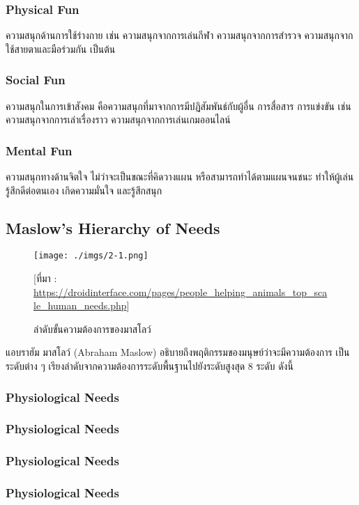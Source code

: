 \documentclass[12pt,oneside,openright,a4paper]{cpe-thai-project}
\begin{document}
\subsubsection{Physical Fun}
ความสนุกด้านการใช้ร่างกาย เช่น ความสนุกจากการเล่นกีฬา 
ความสนุกจากการสำรวจ ความสนุกจากใช้สายตาและมือร่วมกัน เป็นต้น
\subsubsection{Social Fun}
ความสนุกในการเข้าสังคม คือความสนุกที่มาจากการมีปฏิสัมพันธ์กับผู้อื่น 
การสื่อสาร การแข่งขัน เช่น ความสนุกจากการเล่าเรื่องราว 
ความสนุกจากการเล่นเกมออนไลน์
\subsubsection{Mental Fun}
ความสนุกทางด้านจิตใจ ไม่ว่าจะเป็นขณะที่คิดวางแผน 
หรือสามารถทำได้ตามแผนจนชนะ ทำให้ผู้เล่นรู้สึกดีต่อตนเอง 
เกิดความมั่นใจ และรู้สึกสนุก

\subsection{Maslow’s Hierarchy of Needs}

\begin{figure}[!h]\centering
\texttt{[image: ./imgs/2-1.png]}
\caption{ลำดับขั้นความต้องการของมาสโลว์}\label{fig:2-1}
\small [ที่มา : \url{https://droidinterface.com/pages/people_helping_animals_top_scale_human_needs.php}]
\end{figure}

แอบราฮัม มาสโลว์ (Abraham Maslow) อธิบายถึงพฤติกรรมของมนุษย์ว่าจะมีความต้องการ
เป็นระดับต่าง ๆ เรียงลำดับจากความต้องการระดับพื้นฐานไปยังระดับสูงสุด 8 ระดับ ดังนี้

\subsubsection{Physiological Needs}
\subsubsection{Physiological Needs}
\subsubsection{Physiological Needs}
\subsubsection{Physiological Needs}
\end{document}
